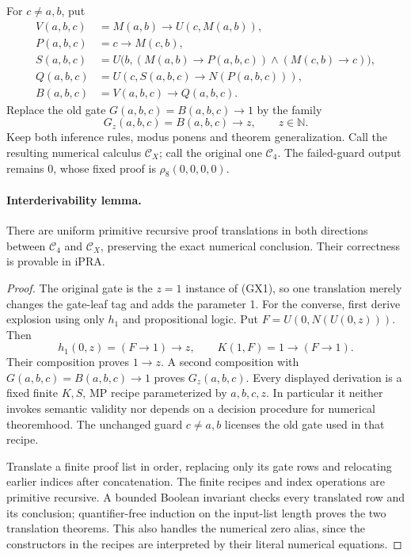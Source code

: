 For $c\ne a,b$, put
\begin{align*}
 V(a,b,c)&=M(a,b)\to U(c,M(a,b)),\\
 P(a,b,c)&=c\to M(c,b),\\
 S(a,b,c)&=U\bigl(b,(M(a,b)\to P(a,b,c))\wedge(M(c,b)\to c)\bigr),\\
 Q(a,b,c)&=U(c,S(a,b,c)\to N(P(a,b,c))),\\
 B(a,b,c)&=V(a,b,c)\to Q(a,b,c).
\end{align*}
Replace the old gate $G(a,b,c)=B(a,b,c)\to1$ by the family
\[
                 G_z(a,b,c)=B(a,b,c)\to z,
                 \qquad z\in\mathbb N.                  \tag{GX1}
\]
Keep both inference rules, modus ponens and theorem generalization.
Call the resulting numerical calculus $\mathcal C_X$; call the original
one $\mathcal C_4$.  The failed-guard output remains 0, whose fixed proof is
$\rho_8(0,0,0,0)$.

\paragraph{Interderivability lemma.}
There are uniform primitive recursive proof translations in both directions
between $\mathcal C_4$ and $\mathcal C_X$, preserving the exact numerical
conclusion.  Their correctness is provable in iPRA.
\begin{proof}
The original gate is the $z=1$ instance of (GX1), so one translation merely
changes the gate-leaf tag and adds the parameter 1.  For the converse, first
derive explosion using only $h_1$ and propositional logic.  Put
$F=U(0,N(U(0,z)))$.  Then
\[
 h_1(0,z)=(F\to1)\to z,\qquad K(1,F)=1\to(F\to1).
\]
Their composition proves $1\to z$.  A second composition with
$G(a,b,c)=B(a,b,c)\to1$ proves $G_z(a,b,c)$.
Every displayed derivation is a fixed finite $K,S$, MP recipe parameterized
by $a,b,c,z$.  In particular it neither invokes semantic validity nor depends
on a decision procedure for numerical theoremhood.  The unchanged guard
$c\ne a,b$ licenses the old gate used in that recipe.

Translate a finite proof list in order, replacing only its gate rows and
relocating earlier indices after concatenation.  The finite recipes and
index operations are primitive recursive.  A bounded Boolean invariant
checks every translated row and its conclusion; quantifier-free induction
on the input-list length proves the two translation theorems.  This also
handles the numerical zero alias, since the constructors in the recipes
are interpreted by their literal numerical equations.
\end{proof}

